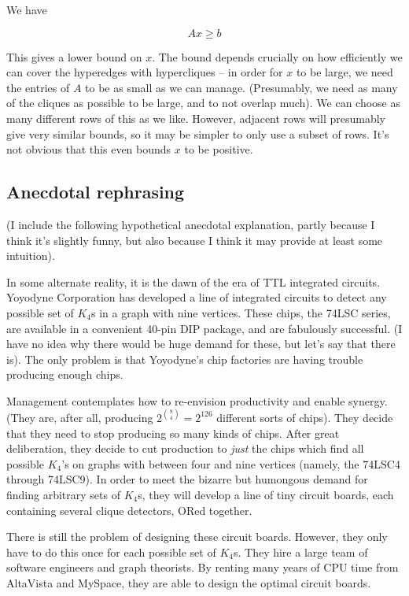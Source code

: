 \documentclass[12pt]{article}
\theoremstyle{definition}
\begin{document}
We have

\[
Ax \ge b
\]

This gives a lower bound on $x$. The bound depends
crucially on how efficiently
we can cover the hyperedges with hypercliques -- in order for $x$ to
be large, we need the entries of $A$ to be as small as we can manage.
(Presumably, we need as many of
the cliques as possible to be large, and to not overlap much).
We can choose as many different rows of this as we like.
However,
adjacent rows will presumably give very similar bounds, so it may be
simpler to only use a subset of rows.
It's not obvious that this even bounds $x$ to be positive.

\subsection{Anecdotal rephrasing}

(I include the following hypothetical anecdotal explanation,
partly because I think it's slightly funny, but also because I think it may
provide at least some intuition).

In some alternate reality, it is the dawn of the era of 
TTL integrated circuits.
Yoyodyne Corporation has developed a line of integrated circuits to detect
any possible set of $K_4$s in a graph with nine vertices.
These chips, the 74LSC series,
are available in a convenient 40-pin DIP package, and are
fabulously successful. (I have no idea why there would be huge demand for
these, but let's say that there is). The only problem is that Yoyodyne's 
chip factories are having trouble producing enough chips.

Management contemplates how to re-envision productivity and enable
synergy. (They are, after all, producing $2^{9 \choose 4} = 2^{126}$
different sorts of chips).
They decide that they need to stop producing so many kinds of chips.
After great deliberation, they decide to cut production to {\em just} the
chips which find all possible
$K_4$'s on graphs with between four and nine vertices (namely, the 74LSC4
through 74LSC9). In order to meet the bizarre but humongous
demand for finding arbitrary sets of $K_4$s, they will develop a
line of tiny circuit boards,
each containing several clique detectors, ORed together.

There is still the problem of designing these circuit boards. However,
they only have to do this once for each possible set of $K_4$s. They hire
a large team of software engineers and graph theorists. By renting
many years of CPU time from AltaVista and MySpace, they are able to design the
optimal circuit boards.
\end{document}
